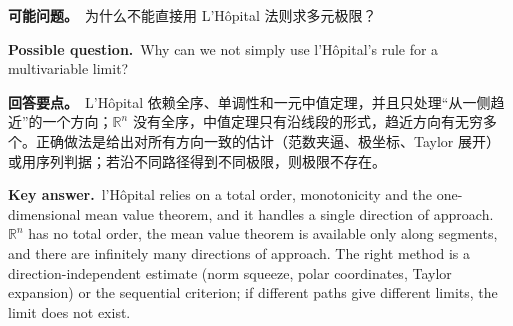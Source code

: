 \documentclass[UTF8,11pt,a4paper]{ctexart}
\newcommand{\ASK}[4]{\begin{samepage}\par\noindent\textbf{可能问题。}\ #1\par\noindent\textbf{Possible question.}\ #2\par\noindent\textbf{回答要点。}\ #3\par\noindent\textbf{Key answer.}\ #4\medskip\end{samepage}}
\begin{document}
\ASK{为什么不能直接用 L'H\^opital 法则求多元极限？}{Why can we not simply use l'H\^opital's rule for a multivariable limit?}{L'H\^opital 依赖全序、单调性和一元中值定理，并且只处理“从一侧趋近”的一个方向；$\mathbb R^n$ 没有全序，中值定理只有沿线段的形式，趋近方向有无穷多个。正确做法是给出对所有方向一致的估计（范数夹逼、极坐标、Taylor 展开）或用序列判据；若沿不同路径得到不同极限，则极限不存在。}{l'H\^opital relies on a total order, monotonicity and the one-dimensional mean value theorem, and it handles a single direction of approach. $\mathbb R^n$ has no total order, the mean value theorem is available only along segments, and there are infinitely many directions of approach. The right method is a direction-independent estimate (norm squeeze, polar coordinates, Taylor expansion) or the sequential criterion; if different paths give different limits, the limit does not exist.}
\end{document}
